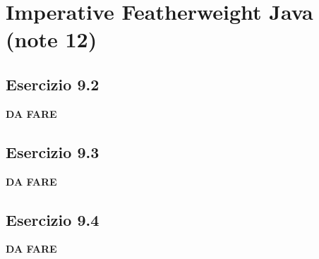 \section{Imperative Featherweight Java (note 12)}  
\subsection*{Esercizio 9.2} 
\textbf{{\color{red} DA FARE}}

\subsection*{Esercizio 9.3} 
\textbf{{\color{red} DA FARE}}

\subsection*{Esercizio 9.4} 
\textbf{{\color{red} DA FARE}} 